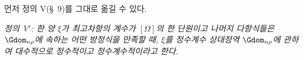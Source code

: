 
먼저 정의 V(\S\ 9)를 그대로 옮길 수 있다.

\emph{정의 V$'$: 한 양 $\xi$가 최고차항의 계수가 $[\Omega]$의 한 단원이고 나머지 다항식들은 $\Gdom_{n\rho}$에 속하는 어떤 방정식을 만족할 때, $\xi$를 정수계수 상대정역 $\Gdom_{n\rho}$에 관하여 대수적으로 정수적이고 정수계수적이라고 한다.}
